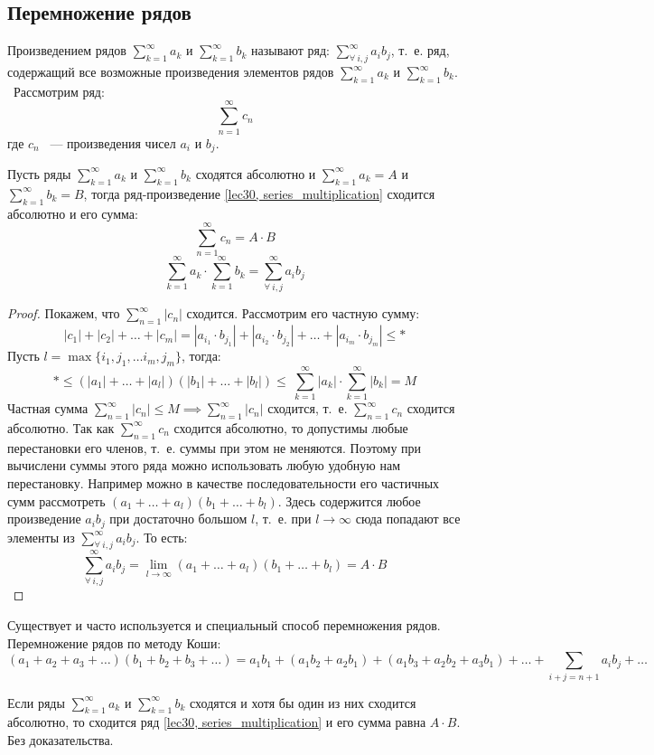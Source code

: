 \documentclass[../../main.tex]{subfiles}
\begin{document}
\subsection{Перемножение рядов}
Произведением рядов $\sum\limits_{k = 1}^{\infty} a_k$ и
$\sum\limits_{k = 1}^{\infty} b_k$ называют ряд:
$\sum\limits_{\forall \ i,j}^{\infty} a_i b_j$, т.~е. ряд, содержащий все
возможные произведения элементов рядов $\sum\limits_{k = 1}^{\infty} a_k$ и
$\sum\limits_{k = 1}^{\infty} b_k$. \ Рассмотрим ряд:
\begin{equation}
	\label{lec30, series_multiplication}
	\sum\limits_{n = 1}^{\infty} c_n
\end{equation}
где $c_n$ ~--- произведения чисел $a_i$ и $b_j$.
\begin{thm}
	Пусть ряды $\sum\limits_{k = 1}^{\infty} a_k$ и
	$\sum\limits_{k = 1}^{\infty} b_k$ сходятся абсолютно и
	$\sum\limits_{k = 1}^{\infty} a_k = A$ и
	$\sum\limits_{k = 1}^{\infty} b_k = B$, тогда ряд-произведение
	\eqref{lec30, series_multiplication} сходится абсолютно и его сумма:
	\[\sum\limits_{n = 1}^{\infty} c_n = A \cdot B \]
	\[\sum\limits_{k = 1}^{\infty} a_k \cdot
	\sum\limits_{k = 1}^{\infty} b_k =
	\sum\limits_{\forall \ i,j}^{\infty} a_i b_j\]
\end{thm}
\begin{proof}
Покажем, что $\sum\limits_{n = 1}^{\infty} |c_n|$ сходится. Рассмотрим
его частную сумму:
\[|c_1| + |c_2| + \ldots + |c_m| = |a_{i_1} \cdot b_{j_1}| +
|a_{i_2} \cdot b_{j_2}| + \ldots + |a_{i_m} \cdot b_{j_m}| \leq *\]
Пусть $l = \max\{i_1, j_1, \ldots i_m, j_m\}$, тогда:
\[* \leq (|a_1| + \ldots + |a_l|)(|b_1| + \ldots + |b_l|)
\leq\ \sum\limits_{k = 1}^{\infty} |a_k| \cdot
\sum\limits_{k = 1}^{\infty} |b_k| = M\]
Частная сумма $\sum\limits_{n = 1}^{\infty} |c_n| \leq M \implies
\sum\limits_{n = 1}^{\infty} |c_n|$ сходится, т.~е.
$\sum\limits_{n = 1}^{\infty} c_n$ сходится абсолютно.
Так как $\sum\limits_{n = 1}^{\infty} c_n$ сходится абсолютно, то допустимы
любые перестановки его членов, т.~е. суммы при этом не меняются. Поэтому при
вычислени суммы этого ряда можно использовать любую удобную нам
перестановку. Например можно в качестве последовательности его частичных
сумм рассмотреть $(a_1 + \ldots + a_l)(b_1 + \ldots + b_l)$. Здесь
содержится любое произведение $a_i b_j$ при достаточно большом $l$, т.~е.
при $l \to \infty$ сюда попадают все элементы из
$\sum\limits_{\forall \ i,j}^{\infty} a_i b_j$. То есть:
\[\sum\limits_{\forall \ i,j}^{\infty} a_i b_j =
\lim\limits_{l \to \infty} (a_1 + \ldots + a_l)(b_1 + \ldots + b_l) =
A \cdot B\]
\end{proof}
Существует и часто используется и специальный способ перемножения рядов.
Перемножение рядов по методу Коши:
\[(a_1 + a_2 + a_3 + \ldots)(b_1 + b_2 + b_3 + \ldots) = a_1 b_1 +
(a_1 b_2 + a_2 b_1) + (a_1 b_3 + a_2 b_2 + a_3 b_1) + \ldots +
\sum\limits_{i + j = n + 1} a_i b_j + \ldots\]
\begin{thm}
Если ряды $\sum\limits_{k = 1}^{\infty} a_k$ и
$\sum\limits_{k = 1}^{\infty} b_k$ сходятся и хотя бы один из них
сходится абсолютно, то сходится ряд \eqref{lec30, series_multiplication}
и его сумма равна $A \cdot B$. Без доказательства.
\end{thm}
\end{document}

